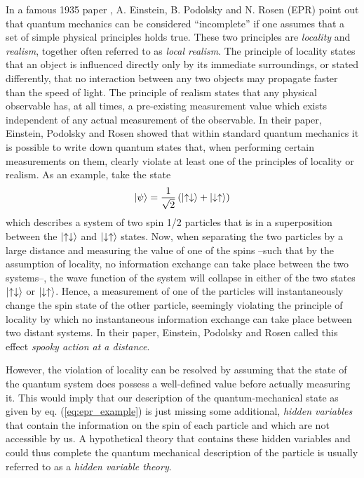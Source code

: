 In a famous 1935 paper \citep{einstein_can_1935}, A. Einstein, B. Podolsky and N. Rosen (EPR) point out that quantum mechanics can be considered ``incomplete'' if one assumes that a set of simple physical principles holds true. These two principles are {\it locality} and {\it realism}, together often referred to as {\it local realism}. The principle of locality states that an object is influenced directly only by its immediate surroundings, or stated differently, that no interaction between any two objects may propagate faster than the speed of light. The principle of realism states that any physical observable has, at all times, a pre-existing measurement value which exists independent of any actual measurement of the observable. In their paper, Einstein, Podolsky and Rosen showed that within standard quantum mechanics it is possible to write down quantum states that, when performing certain measurements on them, clearly violate at least one of the principles of locality or realism. As an example, take the state
%
\begin{equation}
\left| \psi \right> = \frac{1}{\sqrt{2}}\left(\left| \uparrow \downarrow \right>+\left| \downarrow \uparrow \right>\right) \label{eq:epr_example}
\end{equation}
%
which describes a system of two spin 1/2 particles that is in a superposition between the $\left| \uparrow \downarrow \right>$ and $\left| \downarrow \uparrow \right>$ states. Now, when separating the two particles by a large distance and measuring the value of one of the spins --such that by the assumption of locality, no information exchange can take place between the two systems--, the wave function of the system will collapse in either of the two states $\left| \uparrow \downarrow \right>$ or $\left| \downarrow \uparrow \right>$. Hence, a measurement of one of the particles will instantaneously change the spin state of the other particle, seemingly violating the principle of locality by which no instantaneous information exchange can take place between two distant systems. In their paper, Einstein, Podolsky and Rosen called this effect {\it spooky action at a distance}.

\smallskip

However, the violation of locality can be resolved by assuming that the state of the quantum system does  possess a well-defined value before actually measuring it. This would imply that our description of the quantum-mechanical state as given by eq. (\ref{eq:epr_example}) is just missing some additional, {\it hidden variables} that contain the information on the spin of each particle and which are not accessible by us. A hypothetical theory that contains these hidden variables and could thus complete the quantum mechanical description of the particle is usually referred to as a {\it hidden variable theory}.

